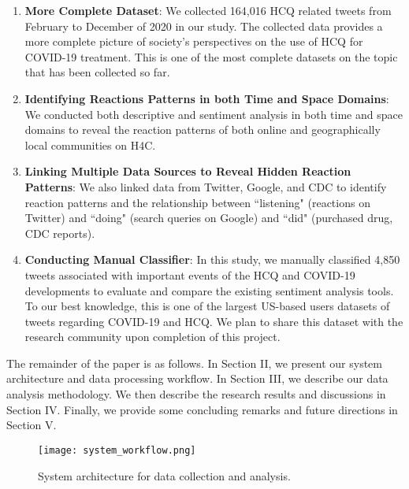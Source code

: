 \documentclass[conference]{IEEEtran}
\begin{document}
	\begin{enumerate}
		\item {\bf More Complete Dataset}: We collected 164,016 HCQ related tweets from February to December of 2020 in our study. The collected data provides a more complete picture of society's perspectives on the use of HCQ for COVID-19 treatment. This is one of the most complete datasets on the topic that has been collected so far.
		\item {\bf Identifying Reactions Patterns in both Time and Space Domains}: We conducted both descriptive and sentiment analysis in both time and space domains to reveal the reaction patterns of both online and geographically local communities on H4C. 
		\item {\bf Linking Multiple Data Sources to Reveal Hidden Reaction Patterns}: We also linked data from Twitter, Google, and CDC to identify reaction patterns and the relationship between ``listening" (reactions on Twitter) and ``doing" (search queries on Google) and ``did" (purchased drug, CDC reports). 
		\item {\bf Conducting Manual Classifier}: In this study, we manually classified 4,850 tweets associated with important events of the HCQ and COVID-19 developments to evaluate and compare the existing sentiment analysis tools. To our best knowledge, this is one of the largest US-based users datasets of tweets regarding COVID-19 and HCQ. We plan to share this dataset with the research community upon completion of this project.
	\end{enumerate}
	
	The remainder of the paper is as follows. In Section II, we present our system architecture and data processing workflow. In Section III, we describe our data analysis methodology. We then describe the research results and discussions in Section IV. Finally, we provide some concluding remarks and future directions in Section V.
	\begin{figure*}[th!]
		\centering 
		\texttt{[image: system\_workflow.png]} 
		\caption{System architecture for data collection and analysis.}
		\label{fig:system_architecture} 
		\vspace{-0.15in}
	\end{figure*}
	
\end{document}
